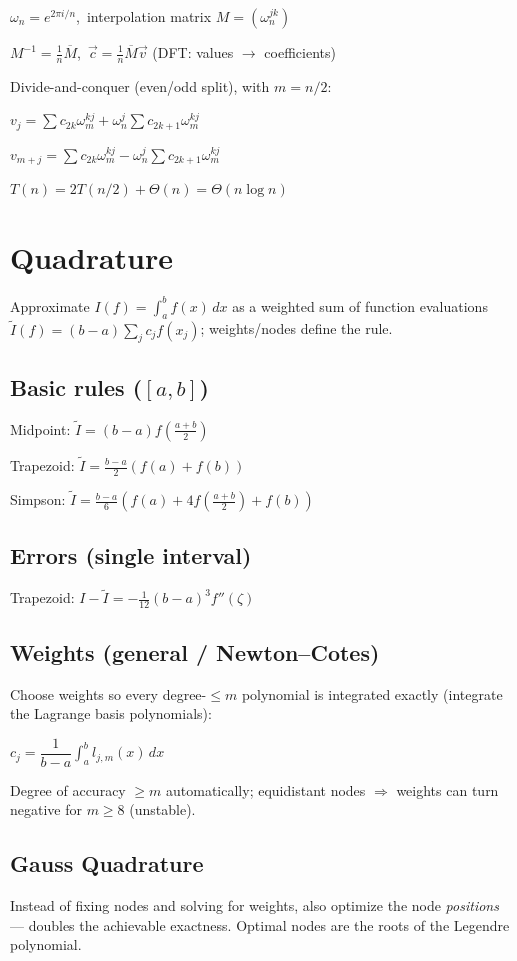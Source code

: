 \documentclass[11pt]{extarticle}
\begin{document}
$\omega_n=e^{2\pi i/n}$,\ interpolation matrix $M=(\omega_n^{jk})$

$M^{-1}=\tfrac1n\overline M$,\ $\vec c=\tfrac1n\overline M\vec v$ (DFT: values $\to$ coefficients)

Divide-and-conquer (even/odd split), with $m=n/2$:

$v_j=\sum c_{2k}\omega_m^{kj}+\omega_n^j\sum c_{2k+1}\omega_m^{kj}$

$v_{m+j}=\sum c_{2k}\omega_m^{kj}-\omega_n^j\sum c_{2k+1}\omega_m^{kj}$

$T(n)=2T(n/2)+\Theta(n)=\Theta(n\log n)$

\section{Quadrature}
Approximate $I(f)=\int_a^b f(x)\,dx$ as a weighted sum of function evaluations $\tilde I(f)=(b{-}a)\sum_j c_jf(x_j)$; weights/nodes define the rule.

\subsection{Basic rules ($[a,b]$)}
Midpoint: $\tilde I=(b{-}a)f(\tfrac{a+b}2)$

Trapezoid: $\tilde I=\tfrac{b-a}2(f(a){+}f(b))$

Simpson: $\tilde I=\tfrac{b-a}6\!\left(f(a){+}4f(\tfrac{a+b}2){+}f(b)\right)$

\subsection{Errors (single interval)}
Trapezoid: $I-\tilde I=-\tfrac1{12}(b-a)^3f''(\zeta)$

\subsection{Weights (general / Newton--Cotes)}
Choose weights so every degree-$\le m$ polynomial is integrated exactly (integrate the Lagrange basis polynomials):

$c_j=\dfrac1{b-a}\displaystyle\int_a^b l_{j,m}(x)\,dx$

Degree of accuracy $\ge m$ automatically; equidistant nodes $\Rightarrow$ weights can turn negative for $m\ge8$ (unstable).

\subsection{Gauss Quadrature}
Instead of fixing nodes and solving for weights, also optimize the node \emph{positions} --- doubles the achievable exactness. Optimal nodes are the roots of the Legendre polynomial.
\end{document}
